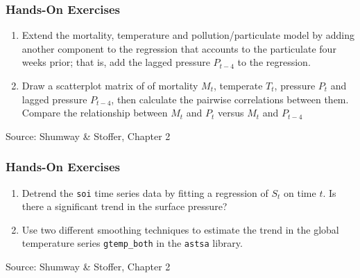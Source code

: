 \begin{tcolorbox}[colback=code]
\subsubsection*{Hands-On Exercises} 
\begin{enumerate}
  \item Extend the mortality, temperature and pollution/particulate model by adding another component to the regression that accounts to the particulate four weeks prior; that is, add the lagged pressure $P_{t-4}$ to the regression.
  \item Draw a scatterplot matrix of of mortality $M_t$, temperate $T_t$, pressure $P_t$ and lagged pressure $P_{t-4}$, then calculate the pairwise correlations between them. Compare the relationship between $M_t$ and $P_t$ versus $M_t$ and $P_{t-4}$
\end{enumerate}

{\footnotesize \vspace{\baselineskip} Source: Shumway \& Stoffer, Chapter 2}
\end{tcolorbox}

\begin{tcolorbox}[colback=code]
\subsubsection*{Hands-On Exercises} 
\begin{enumerate}
  \item Detrend the \texttt{soi} time series data by fitting a regression of $S_t$ on time $t$. Is there a significant trend in the surface pressure?
  \item Use two different smoothing techniques to estimate the trend in the global temperature series \texttt{gtemp\_both} in the \texttt{astsa} library.
\end{enumerate}

{\footnotesize \vspace{\baselineskip} Source: Shumway \& Stoffer, Chapter 2}
\end{tcolorbox}

